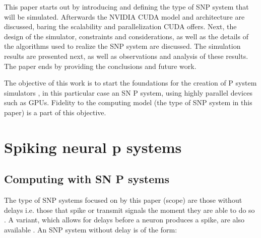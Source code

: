 \documentclass{svmultm}
\begin{document}
This paper starts out by introducing and defining the type of SNP system that will be simulated. Afterwards the NVIDIA CUDA model and architecture are discussed, baring the scalability and parallelization CUDA offers. Next, the design of the simulator, constraints and considerations, as well as the details of the algorithms used to realize the SNP system are discussed. The simulation results are presented next, as well as observations and analysis of these results. The paper ends by providing the conclusions and future work.

The objective of this work is to start the foundations for the creation of P system simulators , in this particular case an SN P system, using highly parallel devices such as  {GPUs}. Fidelity to the computing model (the type of SNP system in this paper) is a part of this objective.




\section{Spiking neural p systems}

\subsection{Computing with SN P systems}\label{computesnp}
The type of SNP systems focused on by this paper (scope) are those without delays i.e. those that spike or transmit signals the moment they are able to do so \cite{snpbrain}\cite{snpmat}. A variant, which allows for delays before a neuron produces a spike, are also available \cite{snp}. An SNP system without delay is of the form:

\end{document}
